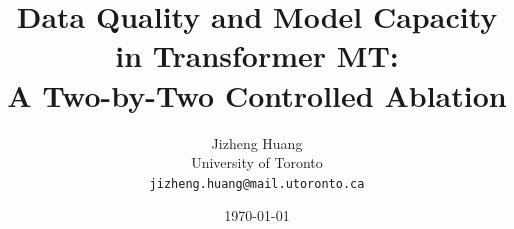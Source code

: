 \documentclass[11pt,a4paper]{article}
\title{Data Quality and Model Capacity in Transformer MT:\\
  A Two-by-Two Controlled Ablation}
\author{
  Jizheng Huang \\
  University of Toronto \\
  \texttt{jizheng.huang@mail.utoronto.ca}
}
\date{\today}
\begin{document}
\maketitle

\begin{abstract}

\end{abstract}













\end{document}
